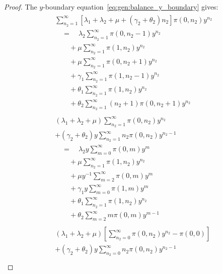 \begin{proof}
    The $y$-boundary equation~\eqref{eq:gen:balance_y_boundary} gives:
    \begin{align}
        \begin{split}
            & \sum_{n_2=1}^{\infty} \left[ \lambda_1 + \lambda_2 + \mu + (\gamma_2 + \theta_2) n_2 \right] \pi(0, n_2) y^{n_2} \\
            & \quad = \quad \lambda_2 \sum_{n_2=1}^{\infty} \pi(0, n_2-1) y^{n_2} \\
            & \quad \quad + \mu \sum_{n_2=1}^{\infty} \pi(1, n_2) y^{n_2} \\
            & \quad \quad + \mu \sum_{n_2=1}^{\infty} \pi(0, n_2+1) y^{n_2} \\
            & \quad \quad + \gamma_1 \sum_{n_2=1}^{\infty} \pi(1, n_2-1) y^{n_2} \\
            & \quad \quad + \theta_1 \sum_{n_2=1}^{\infty} \pi(1, n_2) y^{n_2} \\
            & \quad \quad + \theta_2 \sum_{n_2=1}^{\infty} (n_2+1) \pi(0, n_2+1) y^{n_2}
        \end{split} \nonumber \\
        \begin{split}
            & (\lambda_1 + \lambda_2 + \mu) \sum_{n_2=1}^{\infty} \pi(0, n_2) y^{n_2} \\
            & + (\gamma_2 + \theta_2) y \sum_{n_2=1}^{\infty} n_2 \pi(0, n_2) y^{n_2-1} \\
            & \quad = \quad \lambda_2 y \sum_{m=0}^{\infty} \pi(0, m) y^{m} \\
            & \quad \quad + \mu \sum_{n_2=1}^{\infty} \pi(1, n_2) y^{n_2} \\
            & \quad \quad + \mu y^{-1} \sum_{m=2}^{\infty} \pi(0, m) y^{m} \\
            & \quad \quad + \gamma_1 y \sum_{m=0}^{\infty} \pi(1, m) y^{m} \\
            & \quad \quad + \theta_1 \sum_{n_2=1}^{\infty} \pi(1, n_2) y^{n_2} \\
            & \quad \quad + \theta_2 \sum_{m=2}^{\infty} m \pi(0, m) y^{m-1}
        \end{split} \nonumber \\
        \begin{split}
            & (\lambda_1 + \lambda_2 + \mu) \left[ \sum_{n_2=0}^{\infty} \pi(0, n_2) y^{n_2} - \pi(0,0) \right] \\
            & + (\gamma_2 + \theta_2) y \sum_{n_2=0}^{\infty} n_2 \pi(0, n_2) y^{n_2-1} \\

\end{split}
\end{align}
\end{proof}
